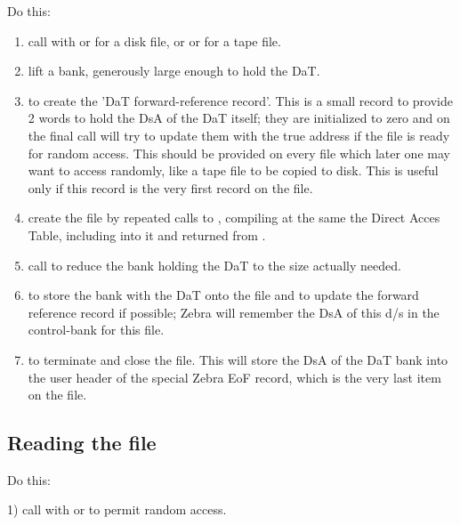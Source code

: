 Do this:
\begin{enumerate}
\item call  with  or  for a disk file, or
       or  for a tape file.
\item lift a bank, generously large enough to hold the DaT.
\item {}  to create the
      'DaT forward-reference record'.
      This is a small record to provide 2 words to hold the DsA of the DaT
      itself; they are initialized to zero and on the final call  will
      try to update them with the true address if the file is ready for
      random access.
      This should be provided on every file which later one may want
      to access randomly, like a tape file to be copied to disk.
      This is useful only if this record is the very first record on the file.
\item create the file by repeated calls to ,
      compiling at the same the Direct Acces Table,
      including into it  and  returned from .
\item call  to reduce the bank holding the DaT to the size
      actually needed.
\item {}  to store the bank with the DaT
      onto the file and to update the forward reference record if possible;
      Zebra will remember the DsA of this d/s in the control-bank for this file.
\item {}  to terminate and close the file.
      This will store the DsA of the DaT bank into the user header of
      the special Zebra EoF record, which is the very last item on the file.
\end{enumerate}

\subsection*{Reading the file}

Do this:

1) call  with  or  to permit random access.

